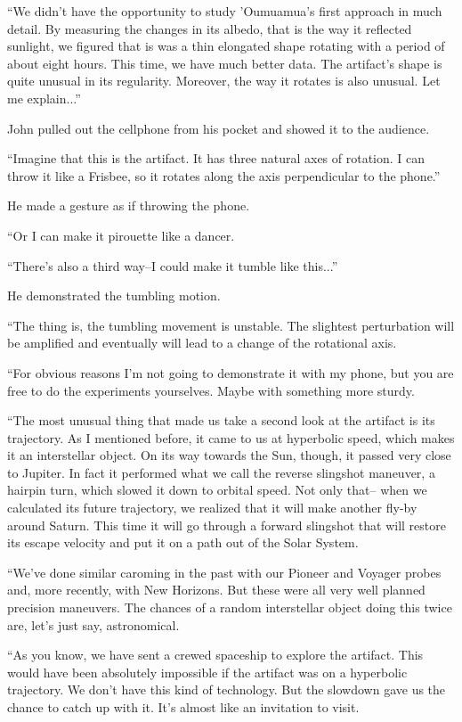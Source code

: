 \documentclass{memoir}
\begin{document}
``We didn't have the opportunity to study 'Oumuamua's first approach in much detail. By measuring the changes in its albedo, that is the way it reflected sunlight, we figured that is was a thin elongated shape rotating with a period of about eight hours. This time, we have much better data. The artifact's shape is quite unusual in its regularity. Moreover, the way it rotates is also unusual. Let me explain...''

John pulled out the cellphone from his pocket and showed it to the audience.

``Imagine that this is the artifact. It has three natural axes of rotation. I can throw it like a Frisbee, so it rotates along the axis perpendicular to the phone.''

He made a gesture as if throwing the phone.

``Or I can make it pirouette like a dancer.

``There's also a third way--I could make it tumble like this...''

He demonstrated the tumbling motion.

``The thing is, the tumbling movement is unstable. The slightest perturbation will be amplified and eventually will lead to a change of the rotational axis. 

``For obvious reasons I'm not going to demonstrate it with my phone, but you are free to do the experiments yourselves. Maybe with something more sturdy.

``The most unusual thing that made us take a second look at the artifact is its trajectory. As I mentioned before, it came to us at hyperbolic speed, which makes it an interstellar object. On its way towards the Sun, though, it passed very close to Jupiter. In fact it performed what we call the reverse slingshot maneuver, a hairpin turn, which slowed it down to orbital speed. Not only that-- when we calculated its future trajectory, we realized that it will make another fly-by around Saturn. This time it will go through a forward slingshot that will restore its escape velocity and put it on a path out of the Solar System.

``We've done similar caroming in the past with our Pioneer and Voyager probes and, more recently, with New Horizons. But these were all very well planned precision maneuvers. The chances of a random interstellar object doing this twice are, let's just say, astronomical. 

``As you know, we have sent a crewed spaceship to explore the artifact. This would have been absolutely impossible if the artifact was on a hyperbolic trajectory. We don't have this kind of technology. But the slowdown gave us the chance to catch up with it. It's almost like an invitation to visit.
\end{document}
